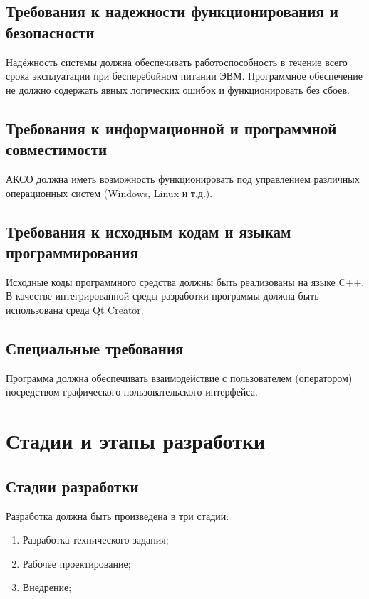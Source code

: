 \documentclass[a4paper,14pt]{extreport}
\begin{document}
	\subsection{Требования к надежности функционирования и безопасности}
	
	Надёжность системы должна обеспечивать работоспособность в течение всего срока эксплуатации при бесперебойном питании ЭВМ. Программное обеспечение не должно содержать явных логических ошибок и функционировать без сбоев.	
	
	\subsection{Требования к информационной и программной совместимости}
	
	АКСО должна иметь возможность функционировать под управлением различных операционных систем (Windows, Linux и т.д.).
	
	\subsection{Требования к исходным кодам и языкам программирования}
	
	Исходные коды программного средства должны быть реализованы на языке C++. В качестве интегрированной среды разработки программы должна быть использована среда Qt Creator.
	
	\subsection{Специальные требования}

	Программа должна обеспечивать взаимодействие с пользователем (оператором) посредством графического пользовательского интерфейса.
	
	\section{Стадии и этапы разработки}
	
	\subsection{Стадии разработки}
	
	Разработка должна быть произведена в три стадии\cite{iso-12207}:
	\begin{enumerate}
		\item Разработка технического задания;
		\item Рабочее проектирование;
		\item Внедрение;
	\end{enumerate}
	
\end{document}
